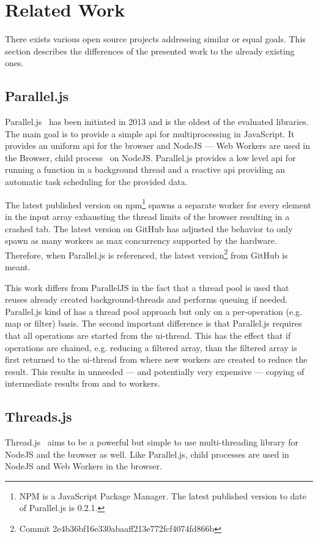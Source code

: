 \section{Related Work}\label{sec:related-work}
There exists various open source projects addressing similar or equal goals. This section describes the differences of the presented work to the already existing ones. 

\subsection{Parallel.js}
Parallel.js~\cite{SavitzkyMayr2016} has been initiated in 2013 and is the oldest of the evaluated libraries. The main goal is to provide a simple api for multiprocessing in JavaScript. It provides an uniform api for the browser and NodeJS --- Web Workers are used in the Browser, child process~\cite{childProcess} on NodeJS. Parallel.js provides a low level api for running a function in a background thread and a reactive api providing an automatic task scheduling for the provided data. 


The latest published version on npm\footnote{NPM is a JavaScript Package Manager. The latest published version to date of Parallel.js is 0.2.1.} spawns a separate worker for every element in the input array exhausting the thread limits of the browser resulting in a crashed tab. The latest version on GitHub has adjusted the behavior to only spawn as many workers as max concurrency supported by the hardware. Therefore, when Parallel.js is referenced, the latest version\footnote{Commit 2e4b36bf16e330abaaff213e772fcf4074fd866b} from GitHub is meant.

This work differs from ParallelJS in the fact that a thread pool is used that reuses already created background-threads and performs queuing if needed. Parallel.js kind of has a thread pool approach but only on a per-operation (e.g. map or filter) basis. The second important difference is that Parallel.js requires that all operations are started from the ui-thread. This has the effect that if operations are chained, e.g. reducing a filtered array, than the filtered array is first returned to the ui-thread from where new workers are created to reduce the result. This results in unneeded --- and potentially very expensive --- copying of intermediate results from and to workers.

\subsection{Threads.js}
Thread.js~\cite{Wermke2016} aims to be a powerful but simple to use multi-threading library for NodeJS and the browser as well. Like Parallel.js, child processes are used in NodeJS and Web Workers in the browser.

